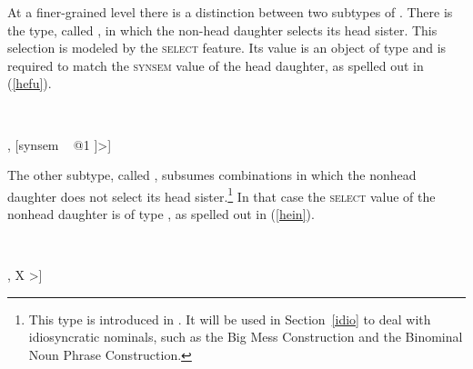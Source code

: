 \documentclass[output=paper
	        ,collection
	        ,collectionchapter
 	        ,biblatex
                ,babelshorthands
                ,newtxmath
                ,draftmode
                ,colorlinks, citecolor=brown
]{langscibook}
\begin{document}
\noindent
At a finer-grained level there is a distinction between two subtypes of 
. There is the type, called ,  
in which the non-head daughter selects its head sister. This selection is modeled 
by the \textsc{select} feature. Its value is an object of type  and is 
required to match the \textsc{synsem} value of the head daughter, as spelled out 
in (\ref{hefu}).  

\begin{exe}
\ex\label{hefu} 
 ~ \impl ~ \\
\begin{avm}
[dtrs ~ <[synsem|loc|category|head|select ~ @1], [synsem ~ @1 ]>] 
\end{avm}
\end{exe} 

\noindent
The other subtype, called , subsumes combinations in 
which the nonhead daughter does not select its head sister.\footnote{This type is 
introduced in \citet[130]{VanEynde98a}. It will be used in Section~\ref{idio} to deal with 
idiosyncratic nominals, such as the Big Mess Construction and the Binominal Noun Phrase 
Construction.} In that case the \textsc{select} value of the nonhead daughter is of type 
, as spelled out in (\ref{hein}). 

\begin{exe}
\ex\label{hein} 
 ~ \impl ~\\
\begin{avm}
[dtrs ~ <[synsem|loc|category|head|select ~ \type{none}], X >]
\end{avm}
\end{exe}    
\end{document}
